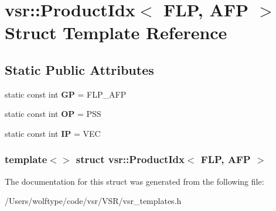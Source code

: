 \hypertarget{structvsr_1_1_product_idx_3_01_f_l_p_00_01_a_f_p_01_4}{\section{vsr\-:\-:Product\-Idx$<$ F\-L\-P, A\-F\-P $>$ Struct Template Reference}
\label{structvsr_1_1_product_idx_3_01_f_l_p_00_01_a_f_p_01_4}
}
\subsection*{Static Public Attributes}
\begin{DoxyCompactItemize}
\item 
\hypertarget{structvsr_1_1_product_idx_3_01_f_l_p_00_01_a_f_p_01_4_adb01ebd694515331d3fcc3d57794f5f3}{static const int {\bfseries G\-P} = F\-L\-P\-\_\-\-A\-F\-P}\label{structvsr_1_1_product_idx_3_01_f_l_p_00_01_a_f_p_01_4_adb01ebd694515331d3fcc3d57794f5f3}

\item 
\hypertarget{structvsr_1_1_product_idx_3_01_f_l_p_00_01_a_f_p_01_4_af8a2ed0756ea9511a948df14a5b77141}{static const int {\bfseries O\-P} = P\-S\-S}\label{structvsr_1_1_product_idx_3_01_f_l_p_00_01_a_f_p_01_4_af8a2ed0756ea9511a948df14a5b77141}

\item 
\hypertarget{structvsr_1_1_product_idx_3_01_f_l_p_00_01_a_f_p_01_4_a1a12da87ddef5fda7dde3256f3e3a70f}{static const int {\bfseries I\-P} = V\-E\-C}\label{structvsr_1_1_product_idx_3_01_f_l_p_00_01_a_f_p_01_4_a1a12da87ddef5fda7dde3256f3e3a70f}

\end{DoxyCompactItemize}
\subsubsection*{template$<$$>$ struct vsr\-::\-Product\-Idx$<$ F\-L\-P, A\-F\-P $>$}



The documentation for this struct was generated from the following file\-:\begin{DoxyCompactItemize}
\item 
/\-Users/wolftype/code/vsr/\-V\-S\-R/vsr\-\_\-templates.\-h\end{DoxyCompactItemize}
